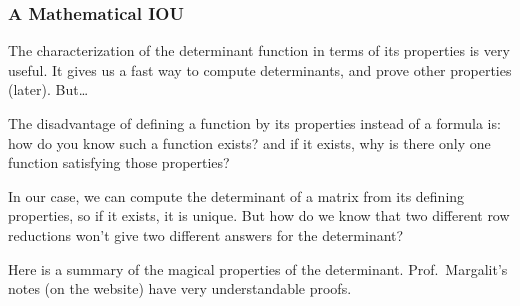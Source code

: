 \begin{frame}
\frametitle{A Mathematical IOU}

The characterization of the determinant function in terms of its properties is
very useful.  It gives us a fast way to compute determinants, and prove other
properties (later).  But\ldots

\pause\bigskip
The disadvantage of defining a function by its properties instead of a formula
is:
\pause
how do you know such a function exists?
\pause
and if it exists, why is there only one function satisfying those properties?

\pause\bigskip
In our case, we can compute the determinant of a matrix from its defining
properties, so if it exists, it is unique.
\pause
But how do we know that two different row reductions won't give
two different answers for the determinant?

\pause\bigskip
Here is a summary of the magical properties of the determinant.  Prof.\
Margalit's notes (on the website) have very understandable proofs.

\end{frame}



